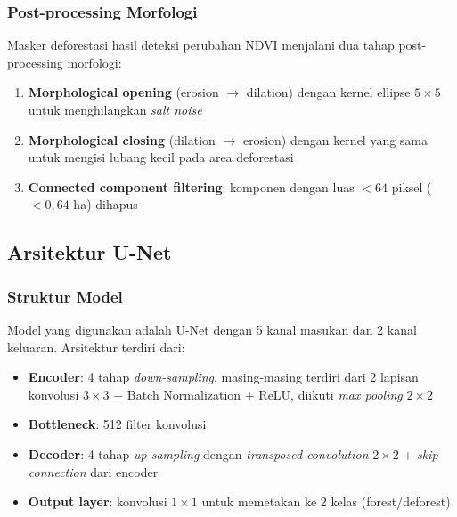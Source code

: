 \documentclass[12pt,a4paper]{article}
\begin{document}
\subsubsection{Post-processing Morfologi}

Masker deforestasi hasil deteksi perubahan NDVI menjalani dua tahap 
post-processing morfologi:

\begin{enumerate}[nosep]
    \item \textbf{Morphological opening} (erosion $\rightarrow$ dilation) 
          dengan kernel ellipse $5 \times 5$ untuk menghilangkan \textit{salt noise}
    \item \textbf{Morphological closing} (dilation $\rightarrow$ erosion) 
          dengan kernel yang sama untuk mengisi lubang kecil pada area deforestasi
    \item \textbf{Connected component filtering}: komponen dengan luas 
          $< 64$ piksel ($< 0,64$ ha) dihapus
\end{enumerate}

\subsection{Arsitektur U-Net}

\subsubsection{Struktur Model}

Model yang digunakan adalah U-Net \cite{ronneberger2015unet} dengan 
5 kanal masukan dan 2 kanal keluaran. Arsitektur terdiri dari:

\begin{itemize}[nosep]
    \item \textbf{Encoder}: 4 tahap \textit{down-sampling}, masing-masing 
          terdiri dari 2 lapisan konvolusi $3 \times 3$ + Batch Normalization 
          + ReLU, diikuti \textit{max pooling} $2 \times 2$
    \item \textbf{Bottleneck}: 512 filter konvolusi
    \item \textbf{Decoder}: 4 tahap \textit{up-sampling} dengan 
          \textit{transposed convolution} $2 \times 2$ + \textit{skip connection} 
          dari encoder
    \item \textbf{Output layer}: konvolusi $1 \times 1$ untuk memetakan ke 
          2 kelas (forest/deforest)
\end{itemize}
\end{document}
